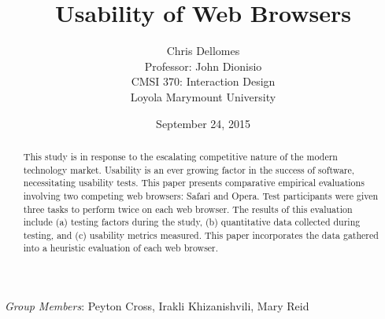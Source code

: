 \documentclass{article}
\begin{document}
\title{Usability of Web Browsers}
\author{Chris Dellomes\\
Professor: John Dionisio\\
CMSI 370: Interaction Design\\
	Loyola Marymount University}

\date{September 24, 2015}

\maketitle

\begin{center}
\begin{abstract}
\noindent This study is in response to the escalating competitive nature of the modern technology market. Usability is an ever growing factor in the success of software, necessitating usability tests. This paper presents comparative empirical evaluations involving two competing web browsers: Safari and Opera. Test participants were given three tasks to perform twice on each web browser. The results of this evaluation include (a) testing factors during the study, (b) quantitative data collected during testing, and (c) usability metrics measured. This paper incorporates the data gathered into a heuristic evaluation of each web browser.
\end{abstract}


\bigskip

\textit{Group Members}: Peyton Cross, Irakli Khizanishvili, Mary Reid
\end{center}

\thispagestyle{empty}

\clearpage

\setcounter{page}{1}
\end{document}
